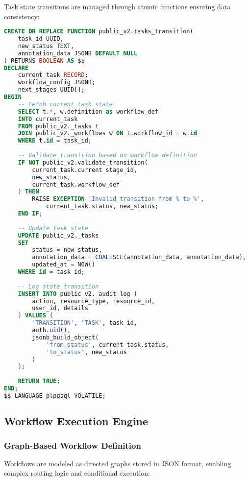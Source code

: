 Task state transitions are managed through atomic functions ensuring data consistency:

\begin{lstlisting}[language=sql, caption=Task State Transition Function]
CREATE OR REPLACE FUNCTION public_v2.tasks_transition(
    task_id UUID,
    new_status TEXT,
    annotation_data JSONB DEFAULT NULL
) RETURNS BOOLEAN AS $$
DECLARE
    current_task RECORD;
    workflow_config JSONB;
    next_stages UUID[];
BEGIN
    -- Fetch current task state
    SELECT t.*, w.definition as workflow_def
    INTO current_task
    FROM public_v2._tasks t
    JOIN public_v2._workflows w ON t.workflow_id = w.id
    WHERE t.id = task_id;
    
    -- Validate transition based on workflow definition
    IF NOT public_v2.validate_transition(
        current_task.current_stage_id, 
        new_status, 
        current_task.workflow_def
    ) THEN
        RAISE EXCEPTION 'Invalid transition from % to %', 
            current_task.status, new_status;
    END IF;
    
    -- Update task state
    UPDATE public_v2._tasks 
    SET 
        status = new_status,
        annotation_data = COALESCE(annotation_data, annotation_data),
        updated_at = NOW()
    WHERE id = task_id;
    
    -- Log state transition
    INSERT INTO public_v2._audit_log (
        action, resource_type, resource_id, 
        user_id, details
    ) VALUES (
        'TRANSITION', 'TASK', task_id,
        auth.uid(), 
        jsonb_build_object(
            'from_status', current_task.status,
            'to_status', new_status
        )
    );
    
    RETURN TRUE;
END;
$$ LANGUAGE plpgsql VOLATILE;
\end{lstlisting}

\subsection{Workflow Execution Engine}
\label{subsec:workflow-execution}

\subsubsection{Graph-Based Workflow Definition}

Workflows are modeled as directed graphs stored in JSON format, enabling complex routing logic and conditional execution:

